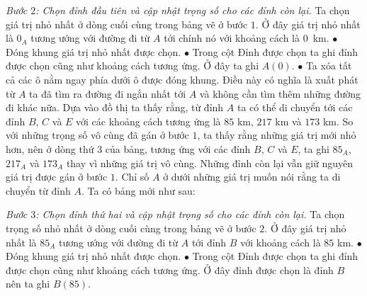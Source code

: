 \begin{multicols}{2}
	\textit{Bước $2$: Chọn đỉnh đầu tiên và cập nhật trọng số cho các đỉnh còn lại.}   
	Ta chọn giá trị nhỏ nhất ở dòng cuối cùng trong bảng vẽ ở bước $1$. Ở đây giá trị nhỏ nhất là $0_A$ tương ướng với đường đi từ $A$ tới chính nó với khoảng cách là $0$~km.
	\vskip 0.1cm
	$\bullet$ Đóng khung giá trị nhỏ nhất được chọn. 
	\vskip 0.1cm
	$\bullet$ Trong cột Đỉnh được chọn ta ghi đỉnh được chọn cũng như khoảng cách tương ứng. Ở đây ta ghi $A(0)$.
	\vskip 0.1cm
	$\bullet$ Ta xóa tất cả các ô nằm ngay phía dưới ô được đóng khung. Điều này có nghĩa là xuất phát từ $A$ ta đã tìm ra đường đi ngắn nhất tới $A$ và không cần tìm thêm những đường đi khác nữa.
	\vskip 0.1cm 
	Dựa vào đồ thị ta thấy rằng, từ đỉnh $A$ ta có thể di chuyển tới các đỉnh $B$, $C$ và $E$ với các khoảng cách tương ứng là $85$ km, $217$ km và $173$ km. So với những trọng số vô cùng đã gán ở bước $1$, ta thấy rằng những giá trị mới nhỏ hơn, nên ở dòng thứ $3$ của bảng, tương ứng với các đỉnh $B$, $C$ và $E$, ta ghi $85_A$, $217_A$ và $173_A$ thay vì những giá trị vô cùng. Những đỉnh còn lại vẫn giữ nguyên giá trị được gán ở bước $1$. Chỉ số $A$ ở dưới những giá trị muốn nói rằng ta di chuyển từ đỉnh $A$.
	\vskip 0.1cm 
	Ta có bảng mới như sau: 
	\begin{table}[H]
		\vspace*{-5pt}
		\centering
		\captionsetup{labelformat= empty, justification=centering}
		\vspace*{-10pt}
	\end{table}
	\textit{Bước $3$: Chọn đỉnh thứ hai và cập nhật trọng số cho các đỉnh còn lại.}  Ta chọn trọng số nhỏ nhất ở dòng cuối cùng trong bảng vẽ ở bước $2$. Ở đây giá trị nhỏ nhất là $85_A$ tương ướng với đường đi từ $A$ tới đỉnh $B$ với khoảng cách là  $85$ km.
	\vskip 0.1cm
	$\bullet$ Đóng khung giá trị nhỏ nhất được chọn. 
	\vskip 0.1cm
	$\bullet$ Trong cột Đỉnh được chọn ta ghi đỉnh được chọn cũng như khoảng cách tương ứng. Ở đây đỉnh được chọn là đỉnh $B$ nên ta ghi $B(85)$.

\end{multicols}
